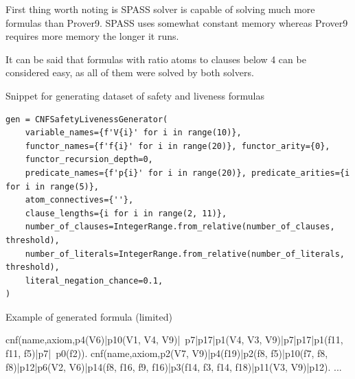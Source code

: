 First thing worth noting is SPASS solver is capable of solving much more formulas than Prover9. SPASS uses somewhat constant memory whereas Prover9 requires more memory the longer it runs.

It can be said that formulas with ratio atoms to clauses below 4 can be considered easy, as all of them were solved by both solvers.

\begin{listing}[ht]
  \caption{Snippet for generating dataset of safety and liveness formulas}
  \label{lis:CNFSafetyLivenesSnippet}
\begin{verbatim}
gen = CNFSafetyLivenessGenerator(
    variable_names={f'V{i}' for i in range(10)},
    functor_names={f'f{i}' for i in range(20)}, functor_arity={0},
    functor_recursion_depth=0,
    predicate_names={f'p{i}' for i in range(20)}, predicate_arities={i for i in range(5)},
    atom_connectives={''},
    clause_lengths={i for i in range(2, 11)},
    number_of_clauses=IntegerRange.from_relative(number_of_clauses, threshold),
    number_of_literals=IntegerRange.from_relative(number_of_literals, threshold),
    literal_negation_chance=0.1,
)
\end{verbatim}
\end{listing}

\begin{listing}[H]
  \caption{Example of generated formula (limited)}
\begin{tptpcode}
% 
cnf(name,axiom,p4(V6)|p10(V1, V4, V9)|~p7|p17|p1(V4, V3, V9)|p7|p17|p1(f11, f11, f5)|p7|~p0(f2)).
cnf(name,axiom,p2(V7, V9)|p4(f19)|p2(f8, f5)|p10(f7, f8, f8)|p12|p6(V2, V6)|p14(f8, f16, f9, f16)|p3(f14, f3, f14, f18)|p11(V3, V9)|p12).
...
\end{tptpcode}
  \label{lis:TPTPExample}
\end{listing}

\newpage

